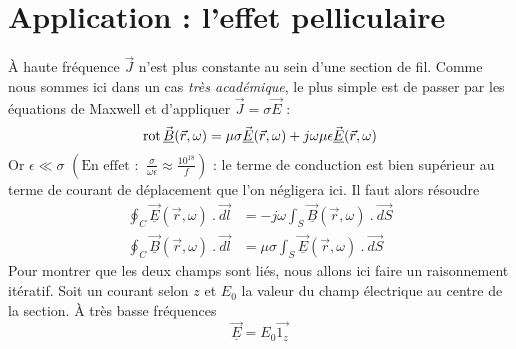 \section{Application : l'effet pelliculaire}
À haute fréquence $\vec{J}$ n'est plus constante au sein d'une section de fil. Comme nous 
sommes ici dans un cas \textit{très académique}, le plus simple est de passer par les équations 
de Maxwell et d'appliquer $\vec{J} =\sigma\vec{E}$ :
\begin{equation}
\text{rot}\,\vec{\underline{B}}(\vec{r},\omega) = \mu\sigma\vec{\underline{E}}(\vec{r},\omega) + j\omega
\mu\epsilon \vec{\underline{E}}(\vec{r},\omega)
\end{equation}
Or $\epsilon \ll \sigma$ $\left(\text{En effet : }\ \frac{\sigma}{\omega\epsilon}\approx\frac{10^{1
8}}{f}\right)$ : le terme de conduction est bien supérieur au terme de courant de déplacement 
que l'on négligera ici. Il faut alors résoudre
\begin{equation}
\begin{split}
\oint_C \vec{\underline{E}}(\vec{r},\omega)\ .\ \vec{dl} &= -j\omega\int_S \vec{\underline{B}}
(\vec{r},\omega)\ .\ \vec{dS}\\
\oint_C \vec{\underline{B}}(\vec{r},\omega)\ .\ \vec{dl} &= \mu\sigma\int_S \vec{\underline{E}}
(\vec{r},\omega)\ .\ \vec{dS}
\end{split}
\end{equation}
Pour montrer que les deux champs sont liés, nous allons ici faire un raisonnement itératif. 
Soit un courant selon $z$ et $E_0$ la valeur du champ électrique au centre de la section. À 
très basse fréquences
\begin{equation}
\vec{\underline{E}} = E_0\vec{1_z}
\end{equation}

